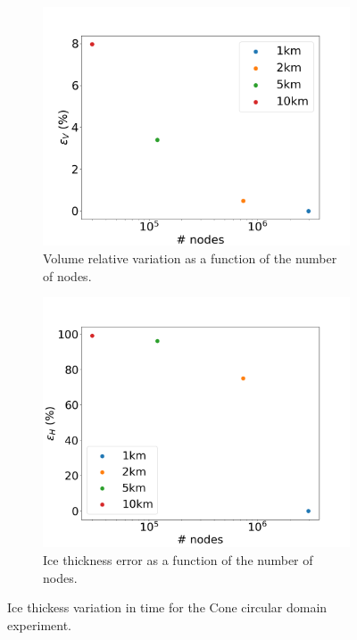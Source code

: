\documentclass{article}
\begin{document}
\begin{figure}[!h]
	\centering
	\begin{subfigure}{.45\textwidth}
		\centering
		\includegraphics[width=1.1\linewidth]{../fig/Volume_CONE_full_all_res_vs_num_nodes.png}
		\caption{Volume relative variation as a function of the number of nodes.}
		\label{VOLUME_CONE_VS_NODES}
	\end{subfigure}
	\begin{subfigure}{.45\textwidth}
		\centering
		\includegraphics[width=1.1\linewidth]{../fig/H_CONE_full_all_res_vs_num_nodes.png}
		\caption{Ice thickness error as a function of the number of nodes.}
		\label{H_CONE_VS_NODES}
	\end{subfigure}
	\caption{Ice thickess variation in time for the Cone circular domain experiment.}
	\label{H_CONE_VS_TIME_VS_NODES}
\end{figure}
\end{document}
